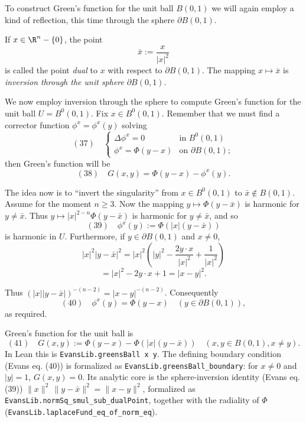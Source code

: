 To construct Green's function for the unit ball $B(0,1)$ we will again employ a kind of reflection, this time through the sphere $\partial B(0,1)$.

\begin{definition}
\label{def:dual-point-unit-sphere}
\leanok
If $x \in \R^n - \{0\}$, the point
$$\bar{x} := \frac{x}{|x|^2}$$
is called the point \textit{dual} to $x$ with respect to $\partial B(0,1)$. The mapping $x \mapsto \bar{x}$ is \textit{inversion through the unit sphere} $\partial B(0,1)$.
\end{definition}

We now employ inversion through the sphere to compute Green's function for the unit ball $U = B^0(0,1)$. Fix $x \in B^0(0,1)$. Remember that we must find a corrector function $\phi^x = \phi^x(y)$ solving
$$(37) \quad \begin{cases} \Delta \phi^x = 0 & \text{in } B^0(0,1) \\ \phi^x = \Phi(y-x) & \text{on } \partial B(0,1); \end{cases}$$
then Green's function will be
$$(38) \quad G(x,y) = \Phi(y-x) - \phi^x(y).$$

The idea now is to ``invert the singularity'' from $x \in B^0(0,1)$ to $\bar{x} \notin B(0,1)$. Assume for the moment $n \geq 3$. Now the mapping $y \mapsto \Phi(y-\bar{x})$ is harmonic for $y \neq \bar{x}$. Thus $y \mapsto |x|^{2-n}\Phi(y-\bar{x})$ is harmonic for $y \neq \bar{x}$, and so
$$(39) \quad \phi^x(y) := \Phi(|x|(y-\bar{x}))$$
is harmonic in $U$. Furthermore, if $y\in\partial B(0, 1)$ and $x \neq 0$,
$$|x|^2|y - \bar{x}|^2 = |x|^2\left(|y|^2 - \frac{2y \cdot x}{|x|^2} + \frac{1}{|x|^2}\right)$$
$$= |x|^2 - 2y \cdot x + 1 = |x - y|^2.$$

Thus $(|x||y - \bar{x}|)^{-(n-2)} = |x - y|^{-(n-2)}$. Consequently
$$(40) \quad \phi^x(y) = \Phi(y - x) \quad (y \in \partial B(0,1)),$$
as required.

\begin{definition}
\label{def:greens-function-ball}
\leanok
Green's function for the unit ball is
$$(41) \quad G(x, y) := \Phi(y - x) - \Phi(|x|(y - \bar{x})) \quad (x, y \in B(0, 1), x \neq y).$$
In Lean this is \lstinline{EvansLib.greensBall x y}. The defining boundary
condition (Evans eq. (40)) is formalized as \lstinline{EvansLib.greensBall_boundary}:
for $x \neq 0$ and $|y| = 1$, $G(x,y) = 0$. Its analytic core is the
sphere-inversion identity (Evans eq. (39))
$\|x\|^2\,\|y - \bar x\|^2 = \|x - y\|^2$, formalized as
\lstinline{EvansLib.normSq_smul_sub_dualPoint}, together with the radiality of $\Phi$
(\lstinline{EvansLib.laplaceFund_eq_of_norm_eq}).
\end{definition}

